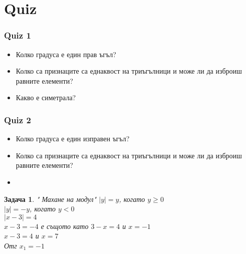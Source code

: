 \documentclass{article}
\theoremstyle{plain}
\newtheorem{problem}{Задача}
\begin{document}
\newpage
\section{Quiz}

\subsubsection{Quiz 1}
\begin{itemize}
	\item Колко градуса е един прав ъгъл?
	\item Колко са признаците са еднаквост на триъгълници и може ли да изброиш равните елементи?
	
	
	\item Какво е симетрала?
\end{itemize}


\subsubsection{Quiz 2}
\begin{itemize}
	\item Колко градуса е един изправен ъгъл?
	\item Колко са признаците са еднаквост на триъгълници и може ли да изброиш равните елементи?
	\item 
\end{itemize}


\begin{problem}" Махане на модул"
	$|y| = y   $, когато $y\geq 0 $\\
	$|y| = -y  $, когато $y<0 $\\
	
	$\left| x -3 \right| = 4 $\\
	$ x - 3= -4 $ е същото като  $ 3-x = 4 $ и $x = -1 $\\
	$ x - 3 = 4 $ и  $x = 7 $\\
	
	Отг $x_1 = -1  $
\end{problem}
\end{document}
